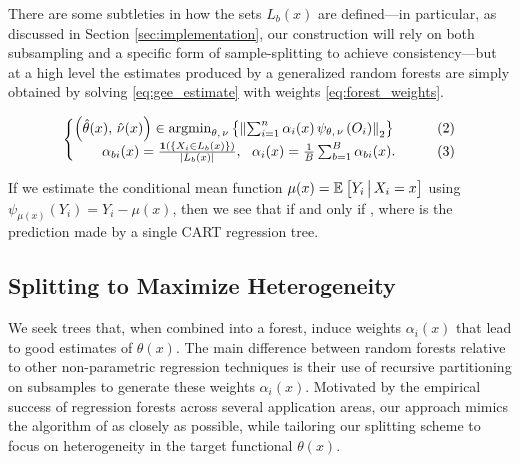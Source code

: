 \documentclass[aos]{imsart}
\theoremstyle{plain}
\theoremstyle{definition}
\theoremstyle{remark}
\begin{document}
\begin{CJK}{UTF8}{gbsn}
There are some subtleties in how the sets $L_b(x)$ are defined---in particular, as discussed in Section \ref{sec:implementation}, our construction will rely on both subsampling and a specific form of sample-splitting to achieve consistency---but at a high level
the estimates  produced by a generalized random forests are simply obtained by solving \eqref{eq:gee_estimate} with weights \eqref{eq:forest_weights}.

\begin{equation*}
\begin{cases}
\p{\htheta(x), \, \hnu(x)} \in \argmin_{\theta, \, \nu} \cb{\Norm{\sum_{i = 1}^n \alpha_i(x) \, \psi_{\theta, \, \nu}\p{O_i}}_2} &\qquad (2) \\
\qquad  \alpha_{bi}(x) = \frac{\1\p{\cb{X_i \in L_b(x)}}}{\abs{L_b(x)}}, \ \ \alpha_i(x) = \frac{1}{B} \sum_{b = 1}^B \alpha_{bi}(x).  &\qquad (3) \\
\end{cases}
\end{equation*}


If we estimate the conditional mean function $\mu(x) = \mathbb{E}_{}\left[Y_i \,\big|\, X_i = x\right]$ using
$\psi_{\mu(x)}(Y_i) = Y_i - \mu(x)$, then we see that
if and only if
,
where  is the
prediction made by a single CART regression tree.

\subsection{Splitting to Maximize Heterogeneity}

We seek trees that, when combined into a forest, induce weights
$\alpha_i(x)$ that lead to good estimates of $\theta(x)$. The main difference between random forests relative to other non-parametric regression techniques
is their use of recursive partitioning on subsamples to generate these weights $\alpha_i(x)$. Motivated by the empirical success of regression forests across several application areas, our approach mimics the algorithm of \citet{breiman2001random} as closely as possible, while tailoring our splitting scheme to focus on heterogeneity in the target functional $\theta(x)$.


\end{CJK}
\end{document}
